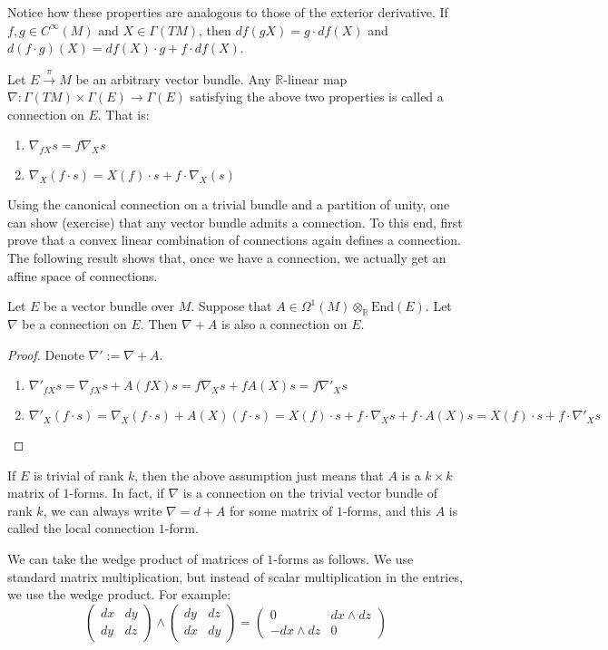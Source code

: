 Notice how these properties are analogous to those of the exterior derivative. If $f,g\in C^\infty(M)$ and $X\in\Gamma(TM)$, then $df(gX)=g\cdot df(X)$ and $d(f\cdot g)(X)=df(X)\cdot g+f\cdot df(X)$.
\begin{definition}
  Let $E\xrightarrow{\pi}M$ be an arbitrary vector bundle. Any $\mathbb{R}$-linear map $\nabla:\Gamma(TM)\times\Gamma(E)\to\Gamma(E)$ satisfying the above two properties is called a connection on $E$. That is:
  \begin{enumerate}
    \item $\nabla_{fX}s=f\nabla_Xs$
    \item $\nabla_X(f\cdot s)=X(f)\cdot s+f\cdot\nabla_X(s)$
  \end{enumerate}
\end{definition}
Using the canonical connection on a trivial bundle and a partition of unity, one can show (exercise) that any vector bundle admits a connection. To this end, first prove that a convex linear combination of connections again defines a connection. The following result shows that, once we have a connection, we actually get an affine space of connections.
\begin{proposition}
  Let $E$ be a vector bundle over $M$. Suppose that $A\in\Omega^1(M)\otimes_\mathbb{R}\text{End}(E)$. Let $\nabla$ be a connection on $E$. Then $\nabla + A$ is also a connection on $E$.
\end{proposition}
\begin{proof}
  Denote $\nabla':=\nabla+A$.
  \begin{enumerate}
    \item $\nabla'_{fX}s=\nabla_{fX}s+A(fX)s=f\nabla_Xs+fA(X)s=f\nabla'_Xs$
    \item $\nabla'_X(f\cdot s)=\nabla_X(f\cdot s)+A(X)(f\cdot s)=X(f)\cdot s+f\cdot\nabla_Xs+f\cdot A(X)s=X(f)\cdot s+f\cdot\nabla'_Xs$
  \end{enumerate}
\end{proof}
If $E$ is trivial of rank $k$, then the above assumption just means that $A$ is a $k\times k$ matrix of $1$-forms. In fact, if $\nabla$ is a connection on the trivial vector bundle of rank $k$, we can always write $\nabla=d+A$ for some matrix of $1$-forms, and this $A$ is called the local connection $1$-form.
\begin{remark}
  We can take the wedge product of matrices of $1$-forms as follows. We use standard matrix multiplication, but instead of scalar multiplication in the entries, we use the wedge product. For example:
  $$\begin{pmatrix}dx & dy\\ dy & dz\end{pmatrix}\wedge\begin{pmatrix}dy & dz\\ dx & dy\end{pmatrix}=\begin{pmatrix}0 & dx\wedge dz\\ -dx\wedge dz & 0\end{pmatrix}$$
\end{remark}
